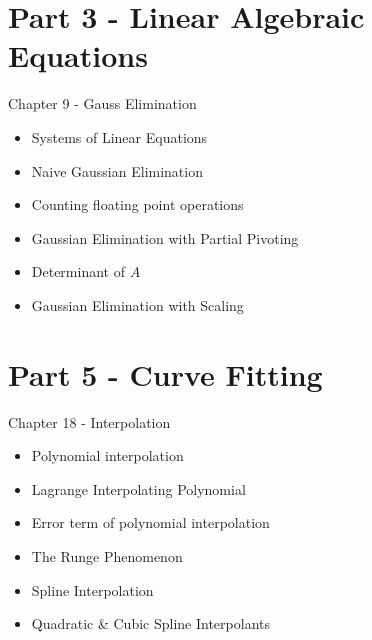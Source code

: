 \documentclass[12pt]{beamer}
\begin{document}
\section{Part 3 - Linear Algebraic Equations}

\begin{frame}{Chapter 9 - Gauss Elimination}

\begin{itemize}

\item{Systems of Linear Equations}

\item{Naive Gaussian Elimination}

\item{Counting floating point operations} 

\item{Gaussian Elimination with Partial Pivoting}

\item{Determinant of $A$}

\item{Gaussian Elimination with Scaling}


\end{itemize}

\end{frame}

\section{Part 5 - Curve Fitting}

\begin{frame}{Chapter 18 - Interpolation}

\begin{itemize}

\item{Polynomial interpolation} 

\item{Lagrange Interpolating Polynomial} 

\item{Error term of polynomial interpolation} 

\item{The Runge Phenomenon}

\item{Spline Interpolation} 

\item{Quadratic \& Cubic Spline Interpolants}

\end{itemize}

\end{frame}
\end{document}
